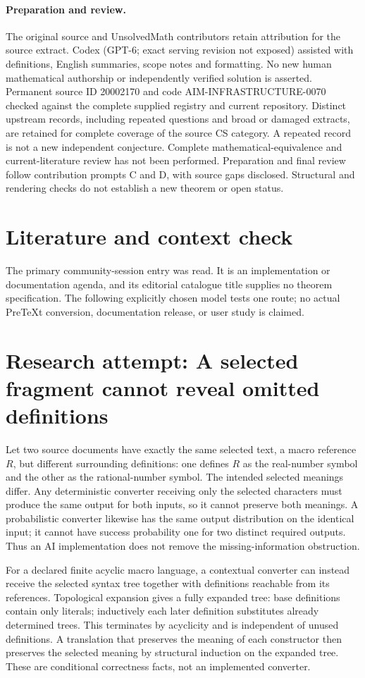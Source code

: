 \documentclass[11pt]{article}
\begin{document}
\paragraph{Preparation and review.}
The original source and UnsolvedMath contributors retain attribution for the source extract. Codex (GPT-6; exact serving revision not exposed) assisted with definitions, English summaries, scope notes and formatting. No new human mathematical authorship or independently verified solution is asserted. Permanent source ID 20002170 and code AIM-INFRASTRUCTURE-0070 checked against the complete supplied registry and current repository. Distinct upstream records, including repeated questions and broad or damaged extracts, are retained for complete coverage of the source CS category. A repeated record is not a new independent conjecture. Complete mathematical-equivalence and current-literature review has not been performed. Preparation and final review follow contribution prompts C and D, with source gaps disclosed. Structural and rendering checks do not establish a new theorem or open status.
\label{end:20002170}

\section{Literature and context check}
The primary community-session entry was read. It is an implementation or documentation agenda, and its editorial catalogue title supplies no theorem specification. The following explicitly chosen model tests one route; no actual PreTeXt conversion, documentation release, or user study is claimed.
\section{Research attempt: A selected fragment cannot reveal omitted definitions}
Let two source documents have exactly the same selected text, a macro reference $R$, but different surrounding definitions: one defines $R$ as the real-number symbol and the other as the rational-number symbol. The intended selected meanings differ. Any deterministic converter receiving only the selected characters must produce the same output for both inputs, so it cannot preserve both meanings. A probabilistic converter likewise has the same output distribution on the identical input; it cannot have success probability one for two distinct required outputs. Thus an AI implementation does not remove the missing-information obstruction.

For a declared finite acyclic macro language, a contextual converter can instead receive the selected syntax tree together with definitions reachable from its references. Topological expansion gives a fully expanded tree: base definitions contain only literals; inductively each later definition substitutes already determined trees. This terminates by acyclicity and is independent of unused definitions. A translation that preserves the meaning of each constructor then preserves the selected meaning by structural induction on the expanded tree. These are conditional correctness facts, not an implemented converter.
\end{document}

